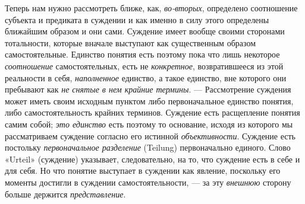\documentclass[twoside]{article}
\begin{document}
{{{{Теперь нам нужно рассмотреть ближе, как,
{\em во-вторых},
определено соотношение субъекта и предиката в суждении и как
именно в силу этого определены ближайшим образом и они сами. Суждение имеет
вообще своими сторонами тотальности, которые вначале выступают как
существенным образом самостоятельные. Единство понятия есть поэтому пока
что лишь некоторое {\em соотношение}
самостоятельных, есть не
{\em конкретное},
возвратившееся из этой реальности в себя,
{\em наполненное}
единство, а такое единство, вне которого они пребывают
как {\em не снятые в нем
крайние термины}. — Рассмотрение суждения может иметь своим
исходным пунктом либо первоначальное единство понятия, либо
самостоятельность крайних терминов. Суждение есть расщепление понятия самим
собой; {\em это единство}
есть поэтому то основание, исходя из которого мы
рассматриваем суждение согласно его истинной
{\em объективности}.
Суждение есть постольку
{\em первоначальное разделение}
(Teilung) первоначально единого. Слово «Urteil» (суждение)
указывает, следовательно, на то, что суждение есть в себе и для себя. Но
что понятие выступает в суждении как явление, поскольку его моменты
достигли в суждении самостоятельности, — за эту
{\em внешнюю} сторону
больше держится {\em представление}.

}}}}
\end{document}
